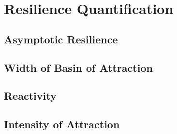 \section{Resilience Quantification}
\label{sec:resilience}

\subsection{Asymptotic Resilience}

\subsection{Width of Basin of Attraction}

\subsection{Reactivity}

\subsection{Intensity of Attraction}
